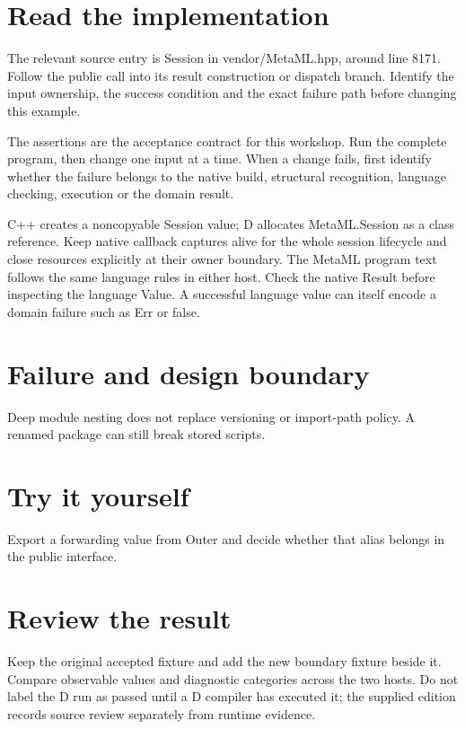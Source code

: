 \section*{Read the implementation}
The relevant source entry is Session in vendor/MetaML.hpp, around line 8171. Follow the public call into its result construction or dispatch branch. Identify the input ownership, the success condition and the exact failure path before changing this example.

The assertions are the acceptance contract for this workshop. Run the complete program, then change one input at a time. When a change fails, first identify whether the failure belongs to the native build, structural recognition, language checking, execution or the domain result.

\clearpage
{}
C++ creates a noncopyable Session value; D allocates MetaML.Session as a class reference. Keep native callback captures alive for the whole session lifecycle and close resources explicitly at their owner boundary. The MetaML program text follows the same language rules in either host. Check the native Result before inspecting the language Value. A successful language value can itself encode a domain failure such as Err or false.


\section*{Failure and design boundary}
Deep module nesting does not replace versioning or import-path policy. A renamed package can still break stored scripts.

\section*{Try it yourself}
Export a forwarding value from Outer and decide whether that alias belongs in the public interface.

\section*{Review the result}
Keep the original accepted fixture and add the new boundary fixture beside it. Compare observable values and diagnostic categories across the two hosts. Do not label the D run as passed until a D compiler has executed it; the supplied edition records source review separately from runtime evidence.

